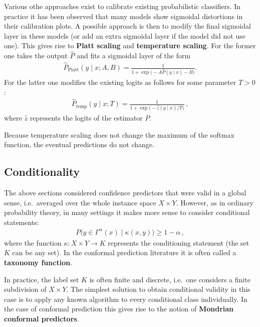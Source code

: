     Various othe approaches exist to calibrate existing probabilistic classifiers. In practice it has been observed that many models show sigmoidal distortions in their calibration plots. A possible approach is then to modify the final sigmoidal layer in these models (or add an extra sigmoidal layer if the model did not use one). This gives rise to \textbf{Platt scaling} and \textbf{temperature scaling}. For the former one takes the output $\widehat{P}$ and fits a sigmoidal layer of the form
    \begin{gather}
        \widehat{P}_\text{Platt}(y\mid x;A,B) = \frac{1}{1+\exp\big(-A\widehat{P}(y\mid x)-B\big)}.
    \end{gather}
    For the latter one modifies the existing logits as follows for some parameter $T>0$:
    \begin{gather}
        \widehat{P}_\text{temp}(y\mid x;T) = \frac{1}{1+\exp\big(-\widehat{z}(y\mid x)/T\big)}\,,
    \end{gather}
    where $\widehat{z}$ represents the logits of the estimator $\widehat{P}$.

    \begin{remark}[Accuracy]
        Because temperature scaling does not change the maximum of the softmax function, the eventual predictions do not change.
    \end{remark}

\subsection{Conditionality}

    The above sections considered confidence predictors that were valid in a global sense, i.e.~averaged over the whole instance space $X\times Y$. However, as in ordinary probability theory, in many settings it makes more sense to consider conditional statements:
    \begin{gather}
        \label{data:conditional_validity_condition}
        P\big(y\in\Gamma^\alpha(x)\mid\kappa(x,y)\big)\geq 1-\alpha\,,
    \end{gather}
    where the function $\kappa:X\times Y\rightarrow K$ represents the conditioning statement (the set $K$ can be any set). In the conformal prediction literature it is often called a \textbf{taxonomy function}.

    In practice, the label set $K$ is often finite and discrete, i.e.~one considers a finite subdivision of $X\times Y$. The simplest solution to obtain conditional validity in this case is to apply any known algorithm to every conditional class individually. In the case of conformal prediction this gives rise to the notion of \textbf{Mondrian conformal predictors}.

